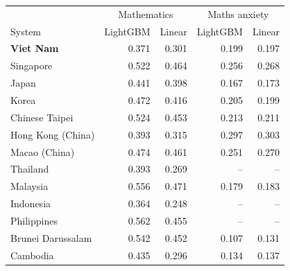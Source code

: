 \begin{tabular}{@{}lrrrr@{}}
\toprule
 & \multicolumn{2}{c}{Mathematics} & \multicolumn{2}{c}{Maths anxiety} \\
System & LightGBM & Linear & LightGBM & Linear \\
\midrule
\textbf{Viet Nam} & 0.371 & 0.301 & 0.199 & 0.197 \\
Singapore & 0.522 & 0.464 & 0.256 & 0.268 \\
Japan & 0.441 & 0.398 & 0.167 & 0.173 \\
Korea & 0.472 & 0.416 & 0.205 & 0.199 \\
Chinese Taipei & 0.524 & 0.453 & 0.213 & 0.211 \\
Hong Kong (China) & 0.393 & 0.315 & 0.297 & 0.303 \\
Macao (China) & 0.474 & 0.461 & 0.251 & 0.270 \\
Thailand & 0.393 & 0.269 & -- & -- \\
Malaysia & 0.556 & 0.471 & 0.179 & 0.183 \\
Indonesia & 0.364 & 0.248 & -- & -- \\
Philippines & 0.562 & 0.455 & -- & -- \\
Brunei Darussalam & 0.542 & 0.452 & 0.107 & 0.131 \\
Cambodia & 0.435 & 0.296 & 0.134 & 0.137 \\
\bottomrule
\end{tabular}
